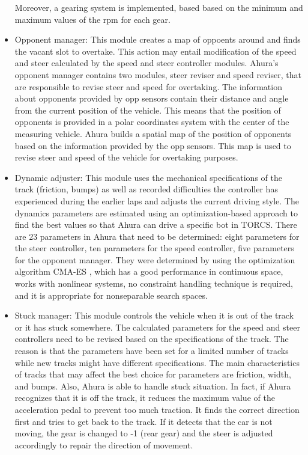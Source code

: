 \begin{itemize}
Moreover, a gearing system is implemented, based based on the minimum and maximum values of the rpm for each gear.
\item Opponent manager: This module creates a map of oppoents around and finds the vacant slot to overtake. This action may entail modification of the speed and steer calculated by the speed and steer controller modules.
Ahura’s opponent manager contains two modules, steer reviser and speed reviser, that are responsible to revise steer and speed for overtaking. The information about opponents provided by opp sensors contain their distance and angle from the current position of the vehicle. This means that the position of opponents is provided in a polar coordinates system with the center of the measuring vehicle. Ahura builds a spatial map of the position of opponents based on the information provided by the opp sensors. This map is used to revise steer and speed of the vehicle for overtaking purposes.
\item Dynamic adjuster: This module uses the mechanical specifications of the track (friction, bumps) as well as recorded difficulties the controller has experienced during the earlier laps and adjusts the current driving style.
The dynamics parameters are estimated using an optimization-based approach to find the best values so that Ahura can drive a specific bot in TORCS. There are 23 parameters in Ahura that need to be determined: eight parameters for the steer controller, ten parameters for the speed controller, five parameters for the opponent manager.
They were determined by using the optimization algorithm CMA-ES \cite{cmaes}, which has a good performance in continuous space, works with nonlinear systems, no constraint handling technique is required, and it is appropriate for nonseparable search spaces.
\item Stuck manager: This module controls the vehicle when it is out of the track or it has stuck somewhere.
The calculated parameters for the speed and steer controllers need to be revised based on the specifications of the track. The reason is that the parameters have been set for a limited number of tracks while new tracks might have different specifications. The main characteristics of tracks that may affect the best choice for parameters are friction, width, and bumps. Also, Ahura is able to handle stuck situation. In fact, if Ahura recognizes that it is off the track, it reduces the maximum value of the acceleration pedal to prevent too much traction. It finds the correct direction first and tries to get back to the track. If it detects that the car is not moving, the gear is changed to -1 (rear gear) and the steer is adjusted accordingly to repair the direction of movement.
\end{itemize}


